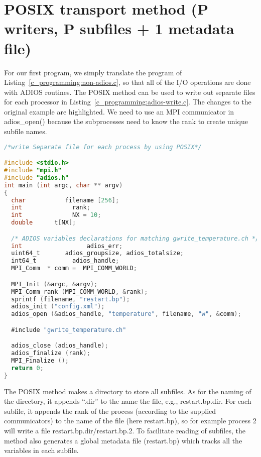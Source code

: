 \section{POSIX transport method (P writers, P subfiles + 1 metadata file)}

For our first program, we simply translate the program of
Listing~\ref{c_programming:non-adios.c}, so that all of the I/O operations
are done with ADIOS routines. The POSIX method can be used to write out
separate files for each processor in
Listing~\ref{c_programming:adios-write.c}. 
The changes to the original
example are highlighted. We need to use an MPI communicator in adios\_open()
because the subprocesses need to know the rank to create unique subfile
names.

\begin{lstlisting}[language=C,caption=Example adios program to write P files from 
P processors (examples/C/manual/2\_adios\_write.c]
/*write Separate file for each process by using POSIX*/

#include <stdio.h>
#include "mpi.h"
#include "adios.h"
int main (int argc, char ** argv) 
{
  char           filename [256];
  int              rank;
  int              NX = 10;
  double      t[NX];

  /* ADIOS variables declarations for matching gwrite_temperature.ch */
  int                  adios_err;
  uint64_t       adios_groupsize, adios_totalsize;
  int64_t          adios_handle;
  MPI_Comm  * comm =  MPI_COMM_WORLD;

  MPI_Init (&argc, &argv);
  MPI_Comm_rank (MPI_COMM_WORLD, &rank);
  sprintf (filename, "restart.bp");
  adios_init ("config.xml");
  adios_open (&adios_handle, "temperature", filename, "w", &comm);

  #include "gwrite_temperature.ch"

  adios_close (adios_handle);
  adios_finalize (rank);
  MPI_Finalize ();
  return 0;
}
\end{lstlisting}\label{c_programming:adios-write.c}

The POSIX method makes a directory to store all subfiles. As for the naming of 
the directory, it appends ``.dir'' to the name the file, e.g., restart.bp.dir. 
For each subfile, it appends the rank of the process (according to the supplied 
communicators) to the name of the file (here restart.bp), so for example process 
2 will write a file restart.bp.dir/restart.bp.2. To facilitate reading of subfiles, 
the method also generates a global metadata file (restart.bp) which tracks all 
the variables in each subfile. 

